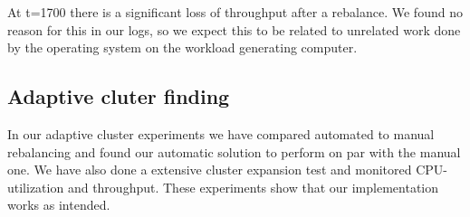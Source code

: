 At t=1700 there is a significant loss of throughput after a rebalance. We found no reason for this in our logs, so we expect this to be related to unrelated work done by the operating system on the workload generating computer. 

\subsection{Adaptive cluter finding}
In our adaptive cluster experiments we have compared automated to manual rebalancing and found our automatic solution to perform on par with the manual one. We have also done a extensive cluster expansion test and monitored CPU-utilization and throughput. These experiments show that our implementation works as intended.





